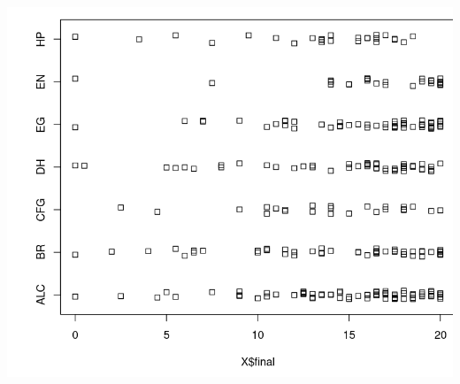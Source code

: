 \documentclass[
]{article}
\begin{document}
\includegraphics{img/stripchart(jitter).png}
\end{document}
